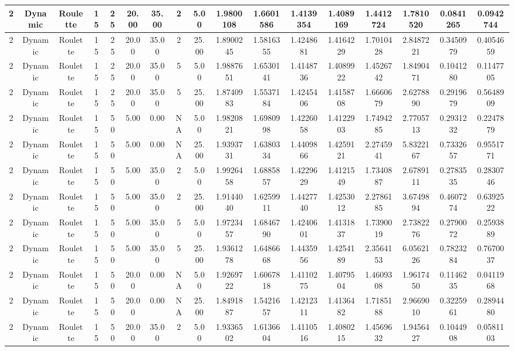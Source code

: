 \documentclass[a4paper]{article}
\begin{document}
\begin{center}
\begin{tabular}{ | c | c | c | c | c | c | c | c | c | c | c | c | c | c | c | c | c | }
		\hline
		2	&	Dynamic	&	Roulette	&	15	&	25	&	20.00	&	35.00	&	2	&	5.00	&	1.9800108	&	1.6601586	&	1.4139354	&	1.4089169	&	1.4412724	&	1.7810520	&	0.0841265	&	0.0942744 \\
		\hline
		2	&	Dynamic	&	Roulette	&	15	&	25	&	20.00	&	35.00	&	2	&	25.00	&	1.8900245	&	1.5816355	&	1.4248681	&	1.4164229	&	1.7010428	&	2.8487221	&	0.3450979	&	0.4054659 \\
		\hline
		2	&	Dynamic	&	Roulette	&	15	&	25	&	20.00	&	35.00	&	5	&	5.00	&	1.9887651	&	1.6530141	&	1.4148736	&	1.4089922	&	1.4526742	&	1.8490471	&	0.1041280	&	0.1147705 \\
		\hline
		2	&	Dynamic	&	Roulette	&	15	&	25	&	20.00	&	35.00	&	5	&	25.00	&	1.8740983	&	1.5537184	&	1.4245406	&	1.4158708	&	1.6660679	&	2.6278890	&	0.2919679	&	0.5648909 \\
		\hline
		2	&	Dynamic	&	Roulette	&	15	&	50	&	5.00	&	0.00	&	NA	&	5.00	&	1.9820821	&	1.6980998	&	1.4226058	&	1.4122903	&	1.7494285	&	2.7705713	&	0.2931232	&	0.2247879 \\
		\hline
		2	&	Dynamic	&	Roulette	&	15	&	50	&	5.00	&	0.00	&	NA	&	25.00	&	1.9393731	&	1.6380334	&	1.4409866	&	1.4259121	&	2.2745941	&	5.8322167	&	0.7332657	&	0.9551771 \\
		\hline
		2	&	Dynamic	&	Roulette	&	15	&	50	&	5.00	&	35.00	&	2	&	5.00	&	1.9926458	&	1.6885857	&	1.4229629	&	1.4121549	&	1.7340887	&	2.6789111	&	0.2783535	&	0.2830746 \\
		\hline
		2	&	Dynamic	&	Roulette	&	15	&	50	&	5.00	&	35.00	&	2	&	25.00	&	1.9144040	&	1.6259911	&	1.4427740	&	1.4253012	&	2.2786185	&	3.6749894	&	0.4607274	&	0.6392522 \\
		\hline
		2	&	Dynamic	&	Roulette	&	15	&	50	&	5.00	&	35.00	&	5	&	5.00	&	1.9723457	&	1.6846790	&	1.4240601	&	1.4131837	&	1.7390019	&	2.7382276	&	0.2790072	&	0.2593889 \\
		\hline
		2	&	Dynamic	&	Roulette	&	15	&	50	&	5.00	&	35.00	&	5	&	25.00	&	1.9361278	&	1.6486668	&	1.4435956	&	1.4254189	&	2.3564153	&	6.0562126	&	0.7823284	&	0.7670037 \\
		\hline
		2	&	Dynamic	&	Roulette	&	15	&	50	&	20.00	&	0.00	&	NA	&	5.00	&	1.9269722	&	1.6067818	&	1.4110275	&	1.4079504	&	1.4609308	&	1.9617450	&	0.1146235	&	0.0411968 \\
		\hline
		2	&	Dynamic	&	Roulette	&	15	&	50	&	20.00	&	0.00	&	NA	&	25.00	&	1.8491887	&	1.5421657	&	1.4212311	&	1.4136482	&	1.7185188	&	2.9669010	&	0.3225961	&	0.2894480 \\
		\hline
		2	&	Dynamic	&	Roulette	&	15	&	50	&	20.00	&	35.00	&	2	&	5.00	&	1.9336502	&	1.6136604	&	1.4110516	&	1.4080215	&	1.4569632	&	1.9456427	&	0.1044908	&	0.0581103 \\

\end{tabular}
\end{center}
\end{document}

